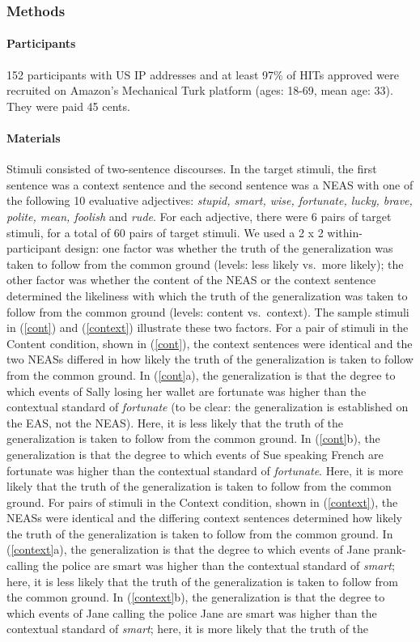 \documentclass[11pt,fleqn]{article}
\newcommand{\6}{\mbox{$[\hspace*{-.6mm}[$}}
\newcommand{\9}{\mbox{$]\hspace*{-.6mm}]$}}
\begin{document}
\subsubsection{Methods}

\paragraph{Participants} 152 participants with US IP addresses and at least 97\% of HITs approved were recruited on Amazon's Mechanical Turk platform (ages: 18-69, mean age: 33). They were paid 45 cents.

\paragraph{Materials} Stimuli consisted of two-sentence discourses. In the target stimuli, the first sentence was a context sentence and the second sentence was a NEAS with one of the following 10 evaluative adjectives: {\em stupid, smart, wise, fortunate, lucky, brave, polite, mean, foolish} and {\em rude}. For each adjective, there were 6 pairs of target stimuli, for a total of 60 pairs of target stimuli. We used a 2 x 2 within-participant design: one factor was whether the truth of the generalization was taken to follow from the common ground (levels: less likely vs.\ more likely); the other factor was whether the content of the NEAS or the context sentence determined the likeliness with which the truth of the generalization was taken to follow from the common ground (levels: content vs.\ context). The sample stimuli in (\ref{cont}) and (\ref{context}) illustrate these two factors. For a pair of stimuli in the Content condition, shown in (\ref{cont}), the context sentences were identical and the two NEASs differed in how likely the truth of the generalization is taken to follow from the common ground. In (\ref{cont}a), the generalization is that the degree to which events of Sally losing her wallet are fortunate was higher than the contextual standard of {\em fortunate} (to be clear: the generalization is established on the EAS, not the NEAS). Here, it is less likely that the truth of the generalization is taken to follow from the common ground. In (\ref{cont}b), the generalization is that the degree to which events of Sue speaking French are fortunate was higher than the contextual standard of {\em fortunate}. Here, it is more likely that the truth of the generalization is taken to follow from the common ground. For pairs of stimuli in the Context condition, shown in (\ref{context}), the NEASs were identical and the differing context sentences determined how likely the truth of the generalization is taken to follow from the common ground. In (\ref{context}a), the generalization is that the degree to which events of Jane prank-calling the police are smart was higher than the contextual standard of {\em smart}; here, it is less likely that the truth of the generalization is taken to follow from the common ground.  In (\ref{context}b), the generalization is that the degree to which events of Jane calling the police Jane are smart was higher than the contextual standard of {\em smart}; here,  it is more likely that the truth of the 
\end{document}
